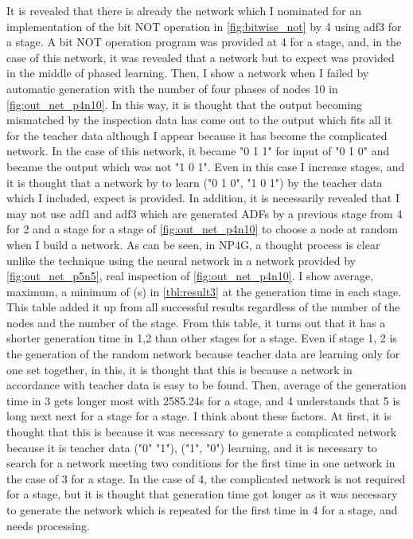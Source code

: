 \documentclass{article}
\begin{document}
It is revealed that there is already the network which I nominated for an implementation of the bit NOT operation in \ref{fig:bitwise_not} by 4 using adf3 for a stage.
A bit NOT operation program was provided at 4 for a stage, and, in the case of this network, it was revealed that a network but to expect was provided in the middle of phased learning.
Then, I show a network when I failed by automatic generation with the number of four phases of nodes 10 in \ref{fig:out_net_p4n10}.
In this way, it is thought that the output becoming mismatched by the inspection data has come out to the output which fits all it for the teacher data although I appear because it has become the complicated network.
In the case of this network, it became "0 1 1" for input of "0 1 0" and became the output which was not "1 0 1".
Even in this case I increase stages, and it is thought that a network by to learn ("0 1 0", "1 0 1") by the teacher data which I included, expect is provided.
In addition, it is necessarily revealed that I may not use adf1 and adf3 which are generated ADFs by a previous stage from 4 for 2 and a stage for a stage of \ref{fig:out_net_p4n10} to choose a node at random when I build a network.
As can be seen, in NP4G, a thought process is clear unlike the technique using the neural network in a network provided by \ref{fig:out_net_p5n5}, real inspection of \ref{fig:out_net_p4n10}.
I show average, maximum, a minimum of (s) in \ref{tbl:result3} at the generation time in each stage.
This table added it up from all successful results regardless of the number of the nodes and the number of the stage.
From this table, it turns out that it has a shorter generation time in 1,2 than other stages for a stage.
Even if stage 1, 2 is the generation of the random network because teacher data are learning only for one set together, in this, it is thought that this is because a network in accordance with teacher data is easy to be found.
Then, average of the generation time in 3 gets longer most with 2585.24s for a stage, and 4 understands that 5 is long next next for a stage for a stage.
I think about these factors.
At first, it is thought that this is because it was necessary to generate a complicated network because it is teacher data ("0" "1"), ("1", "0") learning, and it is necessary to search for a network meeting two conditions for the first time in one network in the case of 3 for a stage.
In the case of 4, the complicated network is not required for a stage, but it is thought that generation time got longer as it was necessary to generate the network which is repeated for the first time in 4 for a stage, and needs processing.
\end{document}
